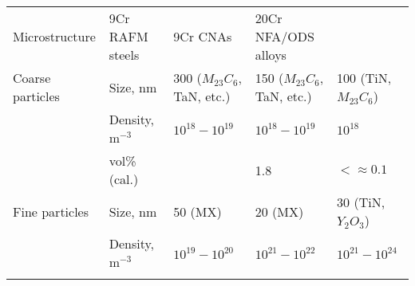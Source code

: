 \documentclass[letterpaper,10pt,english]{jupyterBook}
\begin{document}
	
	\begin{savenotes}\sphinxattablestart
		\sphinxthistablewithglobalstyle
		\centering
		\begin{tabulary}{\linewidth}[t]{TTTTT}
			\sphinxtoprule
			\sphinxstyletheadfamily 
			\sphinxAtStartPar
			Microstructure
			&\sphinxstyletheadfamily 
			\sphinxAtStartPar
			9Cr RAFM steels
			&\sphinxstyletheadfamily 
			\sphinxAtStartPar
			9Cr CNAs
			&\sphinxstyletheadfamily 
			\sphinxhyphen{}20Cr NFA/ODS alloys
			&
			\sphinxAtStartPar
			
			\\
			\sphinxmidrule
			\sphinxtableatstartofbodyhook
			\sphinxAtStartPar
			Coarse particles
			&
			\sphinxAtStartPar
			Size, nm
			&
			\sphinxhyphen{}300 (\(M_{23}C_6\), TaN, etc.)
			&
			\sphinxhyphen{}150 (\(M_{23}C_6\), TaN, etc.)
			&
			\sphinxhyphen{}100 (TiN, \(M_{23}C_6\))
			\\
			\sphinxhline
			\sphinxAtStartPar
			
			&
			\sphinxAtStartPar
			Density, m\(^{-3}\)
			&
			\sphinxAtStartPar
			\(10^{18} - 10^{19}\)
			&
			\sphinxAtStartPar
			\(10^{18} - 10^{19}\)
			&
			\sphinxAtStartPar
			\(10^{18}\)
			\\
			\sphinxhline
			\sphinxAtStartPar
			
			&
			\sphinxAtStartPar
			vol\% (cal.)
			&
			&
			\sphinxhyphen{}1.8
			&
			\sphinxAtStartPar
			\(<\approx 0.1\)
			\\
			\sphinxhline
			\sphinxAtStartPar
			Fine particles
			&
			\sphinxAtStartPar
			Size, nm
			&
			\sphinxhyphen{}50 (MX)
			&
			\sphinxhyphen{}20 (MX)
			&
			\sphinxhyphen{}30 (TiN, \(Y_2 O_3\))
			\\
			\sphinxhline
			\sphinxAtStartPar
			
			&
			\sphinxAtStartPar
			Density, m\(^{-3}\)
			&
			\sphinxAtStartPar
			\(10^{19} - 10^{20}\)
			&
			\sphinxAtStartPar
			\(10^{21} - 10^{22}\)
			&
			\sphinxAtStartPar
			\(10^{21} - 10^{24}\)
			\\
			\sphinxhline
			\sphinxAtStartPar
			

\end{tabulary}
\end{savenotes}
\end{document}
